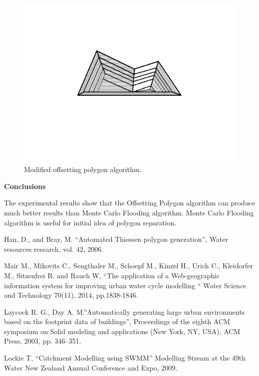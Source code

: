 \documentclass[11pt,leqno]{book}
\def\bibname{{\Large\bf References}}
\newcommand{\sect}[1]{\vskip7mm\par{\large \bf #1}}
\begin{document}
\begin{figure}[h!]
  \centering
  \includegraphics[width=.9\linewidth]{pic14.png}
  \caption{Modified offsetting polygon algorithm.}
\end{figure}
\FloatBarrier

\sect{Conclusions}

The experimental results show that the Offsetting Polygon algorithm can produce much better results than Monte Carlo Flooding algorithm. Monte Carlo Flooding algorithm is useful for initial idea of polygon separation.

\def\bibname{{\Large\bf References}}
\begin{thebibliography}{99}

 Han, D., and Bray, M. “Automated Thiessen polygon generation”, Water resources research, vol. 42, 2006.

 Mair M., Mikovits C., Sengthaler M., Schoepf M., Kinzel H., Urich C., Kleidorfer M., Sitzenfrei R. and Rauch W, “The application of a Web-geographic information system for improving urban water cycle modelling “  Water Science and Technology 70(11), 2014, pp.1838-1846.

 Laycock R. G., Day A. M.”Automatically generating large urban environments based on the footprint data of buildings”, Proceedings of the eighth ACM symposium on Solid modeling and applications (New York, NY, USA), ACM Press, 2003, pp. 346–351.

 Lockie T, “Catchment Modelling using SWMM” Modelling Stream at the 49th Water New Zealand Annual Conference and Expo, 2009.

\end{thebibliography}
\end{document}
